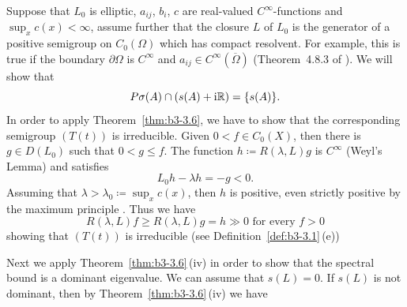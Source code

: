 \begin{examples}
\begin{enumerate}[\upshape (i), wide, labelindent=.25em]
	Suppose that $L_{0}$ is elliptic, $a_{ij}$, $b_{i}$, $c$ are real-valued $C^{\infty}$-functions and $\sup_x c(x) < \infty$, assume further that the closure $L$ of\/ $L_{0}$ is the generator of a positive semigroup on $C_{0}(\Omega)$ which has compact resolvent.
	For example, this is true if the boundary  $\partial\Omega$ is $C^{\infty}$ and $a_{ij} \in C^{\infty}(\overline{\Omega})$ (\cf Theorem~4.8.3 of \textcite{fattorini:1983}).
	We will show that 
    \[
    P\sigma(A)\cap(s(A) + \mathrm{i}\mathbb{R}) = \{s(A)\} .
    \]
	In order to apply Theorem~\ref{thm:b3-3.6}, we have to show that the corresponding semigroup $(T(t))$ is irreducible.
	Given $0 < f \in C_{0}(X)$, then there is $g \in D(L_{0})$ such that $0 < g \leq f$. The function 
	$h \coloneq R(\lambda,L)g$ is $C^{\infty}$ (Weyl's Lemma) and satisfies 
    \[
    L_{0}h - \lambda h = -g < 0 .
    \]
	Assuming that $\lambda > \lambda_{0} \coloneq \sup_x c(x)$, then $h$ is positive, even strictly positive by the maximum principle \textcite[Chapter~2, Theorem~6]{protterweinberger:1967}.
	Thus we have  
    \[ 
    R(\lambda,L)f \geq R(\lambda,L)g = h \gg 0 \text{ for every } f>0 
    \]
    showing that $(T(t))$ is irreducible (see Definition~\ref{def:b3-3.1}\,(e))

Next we apply Theorem~\ref{thm:b3-3.6}\,(iv) in order to show that the spectral bound is a dominant eigenvalue.
	We can assume that $s(L) = 0$.
	If\/ $s(L)$ is not dominant, then by Theorem~\ref{thm:b3-3.6}\,(iv) we have
	

\end{enumerate}
\end{examples}
